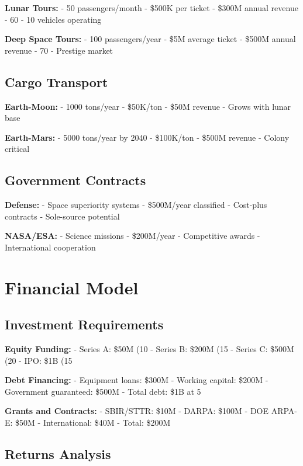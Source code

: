 \documentclass[12pt,letterpaper]{book}
\theoremstyle{definition}
\theoremstyle{plain}
\theoremstyle{remark}
\begin{document}
{{{{{\textbf{Lunar Tours:}
- 50 passengers/month
- \$500K per ticket
- \$300M annual revenue
- 60%
- 10 vehicles operating

\textbf{Deep Space Tours:}
- 100 passengers/year
- \$5M average ticket
- \$500M annual revenue
- 70%
- Prestige market

\subsection{Cargo Transport}

\textbf{Earth-Moon:}
- 1000 tons/year
- \$50K/ton
- \$50M revenue
- Grows with lunar base

\textbf{Earth-Mars:}
- 5000 tons/year by 2040
- \$100K/ton
- \$500M revenue
- Colony critical

\subsection{Government Contracts}

\textbf{Defense:}
- Space superiority systems
- \$500M/year classified
- Cost-plus contracts
- Sole-source potential

\textbf{NASA/ESA:}
- Science missions
- \$200M/year
- Competitive awards
- International cooperation

\section{Financial Model}

\subsection{Investment Requirements}

\textbf{Equity Funding:}
- Series A: \$50M (10%
- Series B: \$200M (15%
- Series C: \$500M (20%
- IPO: \$1B (15%

\textbf{Debt Financing:}
- Equipment loans: \$300M
- Working capital: \$200M
- Government guaranteed: \$500M
- Total debt: \$1B at 5%

\textbf{Grants and Contracts:}
- SBIR/STTR: \$10M
- DARPA: \$100M
- DOE ARPA-E: \$50M
- International: \$40M
- Total: \$200M

\subsection{Returns Analysis}

}}}}}
\end{document}
